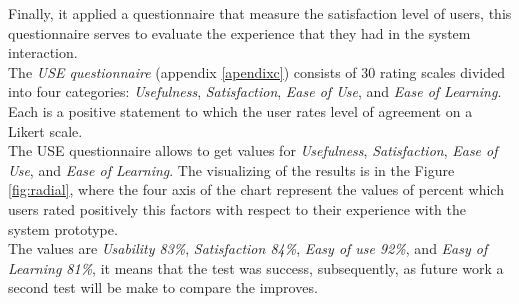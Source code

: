 Finally, it applied a questionnaire that measure the satisfaction
level of users, this questionnaire serves to evaluate the experience
that they had in the system interaction. \\ The \textit{USE
questionnaire} (appendix  \ref{apendixc}) consists of 30 rating
scales divided into four categories: \textit{Usefulness},
\textit{Satisfaction}, \textit{Ease of Use}, and \textit{Ease of
Learning}. Each is a positive statement to which the user rates level
of agreement on a Likert scale. \\ The USE questionnaire allows to get
values for \textit{Usefulness}, \textit{Satisfaction}, \textit{Ease of
Use}, and \textit{Ease of Learning}. The visualizing of the results is in
the Figure  \ref{fig:radial}, where the four axis of the chart
represent the values of percent which users rated positively this
factors with respect to their experience with the system prototype.\\ 
The values are \textit{Usability 83\%}, \textit{Satisfaction 84\%},
\textit{Easy of use  92\%}, and \textit{Easy of Learning 81\%}, it
means that the test was success, subsequently, as future work  a
second test will be make to compare the improves.
